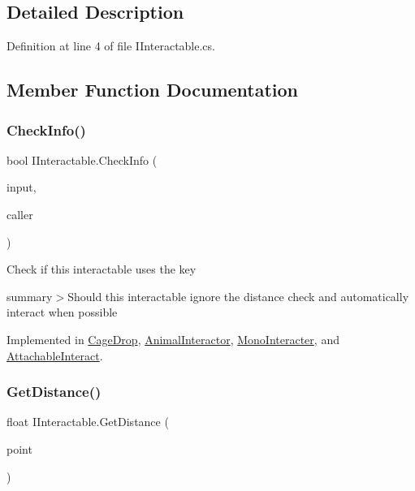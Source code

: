 \subsection{Detailed Description}


Definition at line 4 of file I\+Interactable.\+cs.



\subsection{Member Function Documentation}
\mbox{\label{interface_i_interactable_a5142ebbddd5d91a93da436941ad77d8e}} 
\subsubsection{\texorpdfstring{Check\+Info()}{CheckInfo()}}
{\footnotesize\ttfamily bool I\+Interactable.\+Check\+Info (\begin{DoxyParamCaption}\item[{Input\+Control}]{input,  }\item[{\mbox{\hyperlink{class_animal}{Animal}}}]{caller }\end{DoxyParamCaption})}



Check if this interactable uses the key

summary$>$Should this interactable ignore the distance check and automatically interact when possible

Implemented in \mbox{\hyperlink{class_cage_drop_a38a96e29aa7e79a26f97e0ddf6480b2e}{Cage\+Drop}}, \mbox{\hyperlink{class_animal_interactor_a12da79f6eb050c54043ff783e7c2a725}{Animal\+Interactor}}, \mbox{\hyperlink{class_mono_interacter_ac79722c1e38867f96166dbae403f0110}{Mono\+Interacter}}, and \mbox{\hyperlink{class_attachable_interact_a8426a9821130ecde5ed75517ca2ee5d7}{Attachable\+Interact}}.

\mbox{\label{interface_i_interactable_acde3047364ffe9a4ed107513feb21675}} 
\subsubsection{\texorpdfstring{Get\+Distance()}{GetDistance()}}
{\footnotesize\ttfamily float I\+Interactable.\+Get\+Distance (\begin{DoxyParamCaption}\item[{Vector3}]{point }\end{DoxyParamCaption})}



